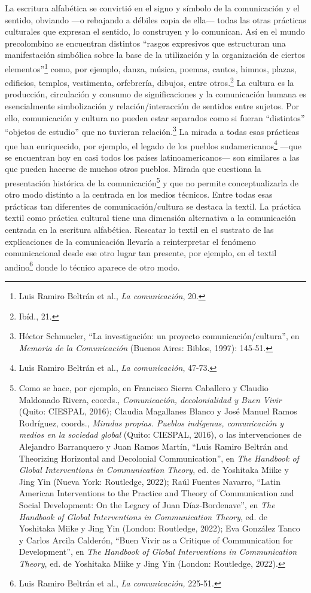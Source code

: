 \documentclass{tufte-handout}
\begin{document}
La escritura alfabética se convirtió en el signo y símbolo de la
comunicación y el sentido, obviando ---o rebajando a débiles copia de
ella--- todas las otras prácticas culturales que expresan el sentido, lo
construyen y lo comunican. Así en el mundo precolombino se encuentran
distintos ``rasgos expresivos que estructuran una manifestación
simbólica sobre la base de la utilización y la organización de ciertos
elementos''\footnote{Luis Ramiro Beltrán et al., \emph{La comunicación},
  20.} como, por ejemplo, danza, música, poemas, cantos, himnos, plazas,
edificios, templos, vestimenta, orfebrería, dibujos, entre
otros.\footnote{Ibíd., 21.} La cultura es la producción, circulación y
consumo de significaciones y la comunicación humana es esencialmente
simbolización y relación/interacción de sentidos entre sujetos. Por
ello, comunicación y cultura no pueden estar separados como si fueran
``distintos'' ``objetos de estudio'' que no tuvieran
relación.\footnote{Héctor Schmucler, ``La investigación: un proyecto
  comunicación/cultura'', en \emph{Memoria de la Comunicación} (Buenos
  Aires: Biblos, 1997): 145-51.} La mirada a todas esas prácticas que
han enriquecido, por ejemplo, el legado de los pueblos
sudamericanos\footnote{Luis Ramiro Beltrán et al., \emph{La
  comunicación}, 47-73.} ---que se encuentran hoy en casi todos los
países latinoamericanos--- son similares a las que pueden hacerse de
muchos otros pueblos. Mirada que cuestiona la presentación histórica de
la comunicación\footnote{Como se hace, por ejemplo, en Francisco Sierra
  Caballero y Claudio Maldonado Rivera, coords., \emph{Comunicación,
  decolonialidad y Buen Vivir} (Quito: CIESPAL, 2016); Claudia
  Magallanes Blanco y José Manuel Ramos Rodríguez, coords.,
  \emph{Miradas propias. Pueblos indígenas, comunicación y medios en la
  sociedad global} (Quito: CIESPAL, 2016), o las intervenciones de
  Alejandro Barranquero y Juan Ramos Martín, ``Luis Ramiro Beltrán and
  Theorizing Horizontal and Decolonial Communication'', en \emph{The
  Handbook of Global Interventions in Communication Theory}, ed. de
  Yoshitaka Miike y Jing Yin (Nueva York: Routledge, 2022); Raúl Fuentes
  Navarro, ``Latin American Interventions to the Practice and Theory of
  Communication and Social Development: On the Legacy of Juan
  Díaz-Bordenave'', en \emph{The Handbook of Global Interventions in Communication Theory}, ed. de Yoshitaka Miike y Jing Yin (London: Routledge, 2022); Eva González
  Tanco y Carlos Arcila Calderón, ``Buen Vivir as a Critique of
  Communication for Development'', en \emph{The Handbook of Global Interventions in Communication Theory}, ed. de Yoshitaka Miike y Jing Yin (London: Routledge, 2022).}
y que no permite conceptualizarla de otro modo distinto a la centrada en
los medios técnicos. Entre todas esas prácticas tan diferentes de
comunicación/cultura se destaca la textil. La práctica textil como
práctica cultural tiene una dimensión alternativa a la comunicación
centrada en la escritura alfabética. Rescatar lo textil en el sustrato
de las explicaciones de la comunicación llevaría a reinterpretar el
fenómeno comunicacional desde ese otro lugar tan presente, por ejemplo,
en el textil andino\footnote{Luis Ramiro Beltrán et al., \emph{La
  comunicación,} 225-51.} donde lo técnico aparece de otro modo.
\end{document}
